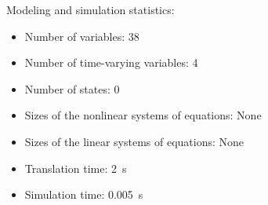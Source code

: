 \begin{contextbox}
  Modeling and simulation statistics:
  \begin{itemize}
    \item Number of variables: 38
    \item Number of time-varying variables: 4
    \item Number of states: 0
    \item Sizes of the nonlinear systems of equations: None
    \item Sizes of the linear systems of equations: None
    \item Translation time: \SI{2}{s}
    \item Simulation time: \SI{0.005}{s}
  \end{itemize}
\end{contextbox}